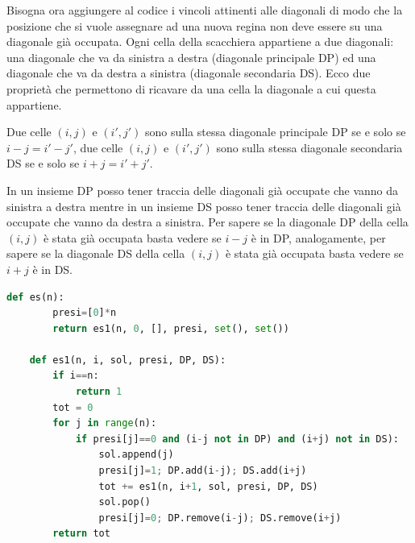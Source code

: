 Bisogna ora aggiungere al codice i vincoli attinenti alle diagonali di modo che la posizione che si vuole assegnare ad una nuova regina non deve essere su una diagonale già occupata. Ogni cella della scacchiera appartiene a due diagonali: una diagonale che va da sinistra a destra (diagonale principale DP) ed una diagonale che va da destra a sinistra (diagonale secondaria DS). Ecco due proprietà che permettono di ricavare da una cella la diagonale a cui questa appartiene. 

Due celle $(i, j)$ e $(i', j')$ sono sulla stessa diagonale principale DP se e solo se $i - j = i' - j'$, due celle $(i, j)$ e $(i', j')$ sono sulla stessa diagonale secondaria DS se e solo se $i + j = i' + j'$.

In un insieme DP posso tener traccia delle diagonali già occupate che vanno da sinistra a destra mentre in un insieme DS posso tener traccia delle diagonali già occupate che vanno da destra a sinistra. Per sapere se la diagonale DP della cella $(i,j)$ è stata già occupata basta vedere se $i-j$ è in DP, analogamente, per sapere se la diagonale DS della cella $(i,j)$ è stata già occupata basta vedere se $i+j$ è in DS.
\begin{lstlisting}[language=Python]
    def es(n):  
        presi=[0]*n 
        return es1(n, 0, [], presi, set(), set())

    def es1(n, i, sol, presi, DP, DS):
        if i==n:
            return 1
        tot = 0
        for j in range(n):
            if presi[j]==0 and (i-j not in DP) and (i+j) not in DS):
                sol.append(j)
                presi[j]=1; DP.add(i-j); DS.add(i+j)
                tot += es1(n, i+1, sol, presi, DP, DS)
                sol.pop()
                presi[j]=0; DP.remove(i-j); DS.remove(i+j)
        return tot
\end{lstlisting}
